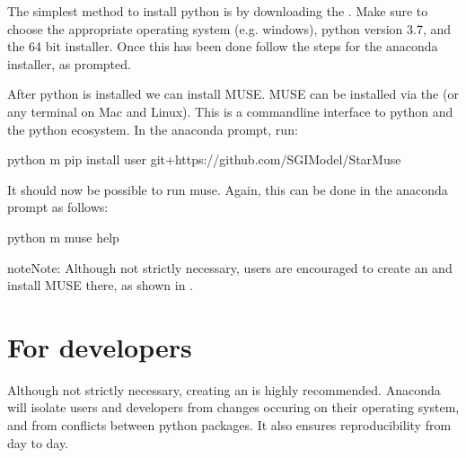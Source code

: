 \documentclass[letterpaper,10pt,english]{sphinxmanual}
\begin{document}
The simplest method to install python is by downloading the . Make sure to choose the appropriate operating system (e.g. windows), python version 3.7, and the 64 bit installer. Once this has been done follow the steps for the anaconda installer, as prompted.

After python is installed we can install MUSE. MUSE can be installed via the  (or any terminal on Mac and Linux). This is a command\sphinxhyphen{}line interface to python and the python eco\sphinxhyphen{}system. In the anaconda prompt, run:

\begin{sphinxVerbatim}[commandchars=\\\{\}]
python \PYGZhy{}m pip install \PYGZhy{}\PYGZhy{}user git+https://github.com/SGIModel/StarMuse
\end{sphinxVerbatim}

It should now be possible to run muse. Again, this can be done in the anaconda prompt as follows:

\begin{sphinxVerbatim}[commandchars=\\\{\}]
python \PYGZhy{}m muse \PYGZhy{}\PYGZhy{}help
\end{sphinxVerbatim}

\begin{sphinxadmonition}{note}{Note:}
Although not strictly necessary, users are encouraged to create an  and install MUSE there, as shown in {\hyperref[\detokenize{installing-muse:installation-devs}]{}}.
\end{sphinxadmonition}


\section{For developers}
\label{\detokenize{installing-muse:for-developers}}\label{\detokenize{installing-muse:installation-devs}}
Although not strictly necessary, creating an  is highly
recommended. Anaconda will isolate users and developers from changes occuring on their
operating system, and from conflicts between python packages. It also ensures reproducibility
from day to day.
\end{document}
